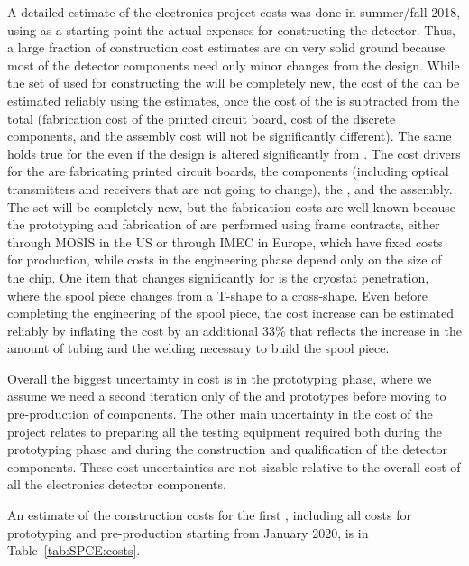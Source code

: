A detailed estimate of the  electronics project costs was done in summer/fall 2018, using as a starting point
the actual expenses for constructing the 
detector. Thus, a large fraction of construction
cost estimates are on very solid ground because most of the detector components 
need only minor changes from the  design. While the
set of  used for constructing the 
will be completely new, the cost of the  can
be estimated reliably using the  estimates,
once the cost of the  is subtracted from the total
(fabrication cost of the printed circuit board,
cost of the discrete components, and the assembly cost
will not be significantly different). The same holds true
for the  even if the design is altered significantly
from .
The cost drivers for the  are fabricating
printed circuit boards, the components (including
optical transmitters and receivers that are not going to change),
the , and the assembly. The  set will
be completely new, but the fabrication costs are well
known because the prototyping and fabrication of
 are performed using frame contracts, either
through MOSIS in the US or through IMEC in Europe, which
have fixed costs for production, while costs in the engineering
phase depend only on the size of the chip. One item that
changes significantly for  is the cryostat penetration,
where the spool piece changes from a T-shape to a cross-shape.
Even before completing the engineering of the spool piece,
the cost increase can be estimated reliably by
inflating the cost by an additional 33\% that reflects the increase
in the amount of tubing and the welding necessary to build
the spool piece. 

Overall the biggest uncertainty in cost is
in the prototyping phase, where we assume we need  a second
iteration only of the  and  prototypes
before moving to pre-production of 
components. The other main uncertainty in the cost of the
project relates to preparing all the testing
equipment required both during the prototyping phase and
during the construction and qualification of the detector
components. These cost uncertainties are not sizable 
relative to the overall cost of all the  electronics
detector components.

An estimate of the construction costs for the first 
 , including all costs for prototyping and
pre-production starting from January 2020, is in Table~\ref{tab:SPCE:costs}.

